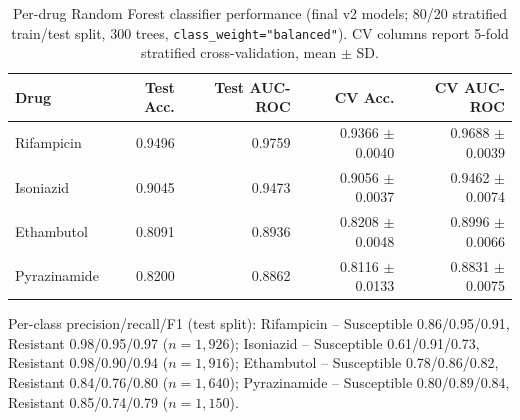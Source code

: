 \begin{table}[t]
\centering
\caption{Per-drug Random Forest classifier performance (final v2 models; 80/20 stratified train/test split, 300 trees, \texttt{class\_weight="balanced"}). CV columns report 5-fold stratified cross-validation, mean $\pm$ SD.}
\label{tab:perdrug}
\begin{tabular}{lrrrr}
\toprule
Drug & Test Acc. & Test AUC-ROC & CV Acc. & CV AUC-ROC \\
\midrule
Rifampicin   & 0.9496 & 0.9759 & 0.9366 $\pm$ 0.0040 & 0.9688 $\pm$ 0.0039 \\
Isoniazid    & 0.9045 & 0.9473 & 0.9056 $\pm$ 0.0037 & 0.9462 $\pm$ 0.0074 \\
Ethambutol   & 0.8091 & 0.8936 & 0.8208 $\pm$ 0.0048 & 0.8996 $\pm$ 0.0066 \\
Pyrazinamide & 0.8200 & 0.8862 & 0.8116 $\pm$ 0.0133 & 0.8831 $\pm$ 0.0075 \\
\bottomrule
\end{tabular}

\vspace{4pt}
\footnotesize
Per-class precision/recall/F1 (test split): Rifampicin -- Susceptible 0.86/0.95/0.91, Resistant 0.98/0.95/0.97 ($n=1{,}926$); Isoniazid -- Susceptible 0.61/0.91/0.73, Resistant 0.98/0.90/0.94 ($n=1{,}916$); Ethambutol -- Susceptible 0.78/0.86/0.82, Resistant 0.84/0.76/0.80 ($n=1{,}640$); Pyrazinamide -- Susceptible 0.80/0.89/0.84, Resistant 0.85/0.74/0.79 ($n=1{,}150$).
\end{table}
